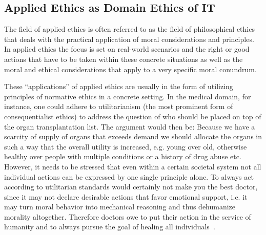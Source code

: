 \documentclass[manuscript,screen]{acmart}
\begin{document}
\subsection{Applied Ethics as Domain Ethics of IT}
The field of applied ethics is often referred to as the field of philosophical ethics that deals with the practical application of moral considerations and principles. In applied ethics the focus is set on real-world scenarios and the right or good actions that have to be taken within these concrete situations as well as the moral and ethical considerations that apply to a very specific moral conundrum. 

These “applications” of applied ethics are usually in the form of utilizing principles of normative ethics in a concrete setting. In the medical domain, for instance, one could adhere to utilitarianism (the most prominent form of consequentialist ethics) to address the question of who should be placed on top of the organ transplantation list. The argument would then be: Because we have a scarcity of supply of organs that exceeds demand we should allocate the organs in such a way that the overall utility is increased, e.g. young over old, otherwise healthy over people with multiple conditions or a history of drug abuse etc. However, it needs to be stressed that even within a certain societal system not all individual actions can be expressed by one single principle alone. To always act according to utilitarian standards would certainly not make you the best doctor, since it may not declare desirable actions that favor emotional support, i.e. it may turn moral behavior into mechanical reasoning and thus dehumanize morality altogether. Therefore doctors owe to put their action in the service of humanity and to always pursue the goal of healing all individuals~\cite{montgomery2018genfer}. 
\end{document}
